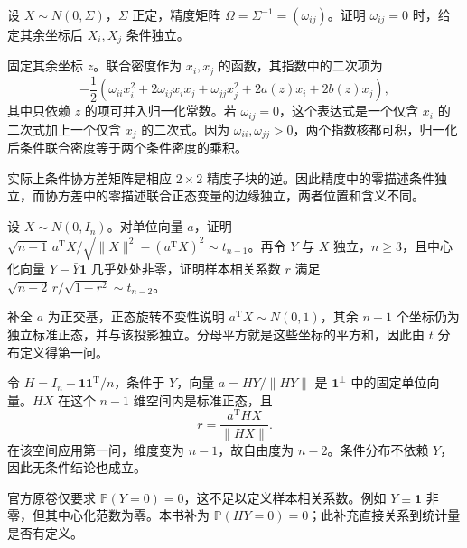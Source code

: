 \documentclass[UTF8,12pt,a4paper,fontset=fandol]{ctexbook}
\newcommand{\PP}{\mathbb P}
\begin{document}
\begin{example}[原题4：精度矩阵与条件独立]\label{yau:2018-4}
设 $X\sim N(0,\Sigma)$，$\Sigma$ 正定，精度矩阵 $\Omega=\Sigma^{-1}=(\omega_{ij})$。证明 $\omega_{ij}=0$ 时，给定其余坐标后 $X_i,X_j$ 条件独立。
\end{example}
\begin{solve}
固定其余坐标 $z$。联合密度作为 $x_i,x_j$ 的函数，其指数中的二次项为
\[
-\frac12\left(\omega_{ii}x_i^2+2\omega_{ij}x_ix_j+\omega_{jj}x_j^2+2a(z)x_i+2b(z)x_j\right),
\]
其中只依赖 $z$ 的项可并入归一化常数。若 $\omega_{ij}=0$，这个表达式是一个仅含 $x_i$ 的二次式加上一个仅含 $x_j$ 的二次式。因为 $\omega_{ii},\omega_{jj}>0$，两个指数核都可积，归一化后条件联合密度等于两个条件密度的乘积。

实际上条件协方差矩阵是相应 $2\times2$ 精度子块的逆。因此精度中的零描述条件独立，而协方差中的零描述联合正态变量的边缘独立，两者位置和含义不同。
\end{solve}

\begin{example}[原题5：正态向量的投影与样本相关系数]\label{yau:2018-5}
设 $X\sim N(0,I_n)$。对单位向量 $a$，证明 $\sqrt{n-1}\,a^{\mathrm T}X/\sqrt{\|X\|^2-(a^{\mathrm T}X)^2}\sim t_{n-1}$。再令 $Y$ 与 $X$ 独立，$n\ge3$，且中心化向量 $Y-\bar Y\mathbf1$ 几乎处处非零，证明样本相关系数 $r$ 满足 $\sqrt{n-2}\,r/\sqrt{1-r^2}\sim t_{n-2}$。
\end{example}
\begin{solve}
补全 $a$ 为正交基，正态旋转不变性说明 $a^{\mathrm T}X\sim N(0,1)$，其余 $n-1$ 个坐标仍为独立标准正态，并与该投影独立。分母平方就是这些坐标的平方和，因此由 $t$ 分布定义得第一问。

令 $H=I_n-\mathbf1\mathbf1^{\mathrm T}/n$，条件于 $Y$，向量 $a=HY/\|HY\|$ 是 $\mathbf1^\perp$ 中的固定单位向量。$HX$ 在这个 $n-1$ 维空间内是标准正态，且
\[
r=\frac{a^{\mathrm T}HX}{\|HX\|}.
\]
在该空间应用第一问，维度变为 $n-1$，故自由度为 $n-2$。条件分布不依赖 $Y$，因此无条件结论也成立。

官方原卷仅要求 $\PP(Y=0)=0$，这不足以定义样本相关系数。例如 $Y\equiv\mathbf1$ 非零，但其中心化范数为零。本书补为 $\PP(HY=0)=0$；此补充直接关系到统计量是否有定义。
\end{solve}
\end{document}
